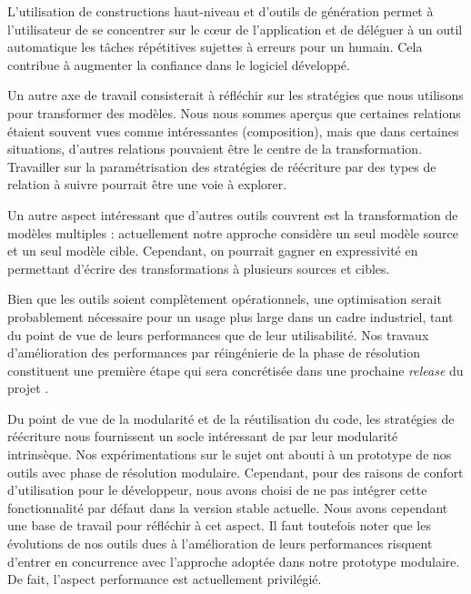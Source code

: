 L'utilisation de constructions haut-niveau et d'outils de génération permet à
l'utilisateur de se concentrer sur le cœur de l'application et de déléguer à un
outil automatique les tâches répétitives sujettes à erreurs pour un humain.
Cela contribue à augmenter la confiance dans le logiciel développé.

Un autre axe de travail consisterait à réfléchir sur les stratégies que nous
utilisons pour transformer des modèles.  Nous nous sommes aperçus que certaines
relations étaient souvent vues comme intéressantes (composition), mais que dans
certaines situations, d'autres relations pouvaient être le centre de la
transformation. Travailler sur la paramétrisation des stratégies de réécriture
par des types de relation à suivre pourrait être une voie à explorer.

Un autre aspect intéressant que d'autres outils couvrent est la transformation
de modèles multiples : actuellement notre approche considère un seul modèle
source et un seul modèle cible. Cependant, on pourrait gagner en expressivité
en permettant d'écrire des transformations à plusieurs sources et cibles. %

Bien que les outils soient complètement opérationnels, une optimisation serait
probablement nécessaire pour un usage plus large dans un cadre industriel, tant
du point de vue de leurs performances que de leur utilisabilité. Nos travaux
d'amélioration des performances par réingénierie de la phase de résolution
constituent une première étape qui sera concrétisée dans une prochaine
\emph{release} du projet {\tom}.

Du point de vue de la modularité et de la réutilisation du code, les stratégies
de réécriture nous fournissent un socle intéressant de par leur modularité
intrinsèque. Nos expérimentations sur le sujet ont abouti à un prototype de nos
outils avec phase de résolution modulaire. Cependant, pour des raisons de
confort d'utilisation pour le développeur, nous avons choisi de ne pas intégrer
cette fonctionnalité par défaut dans la version stable actuelle. Nous avons
cependant une base de travail pour réfléchir à cet aspect. Il faut toutefois
noter que les évolutions de nos outils dues à l'amélioration de leurs
performances risquent d'entrer en concurrence avec l'approche adoptée dans
notre prototype modulaire. De fait, l'aspect performance est actuellement
privilégié.

